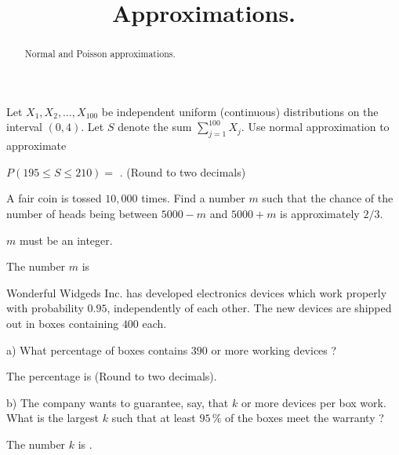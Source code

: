 \documentclass{ximera}
\title{Approximations.}
\begin{document}
\begin{abstract}
Normal and Poisson approximations.
\end{abstract}
\maketitle

Let $X_{1}, X_{2}, \dots, X_{100}$ be independent uniform (continuous) distributions on the interval $(0,4)$. Let $S$ denote the sum $\sum_{j=1}^{100} X_{j}$. Use normal approximation to approximate

\begin{question} 
     \begin{solution}
          $P(195\leq S \leq 210) = $  . (Round to two decimals)
     \end{solution}
\end{question}

A fair coin is tossed $10,000$ times. Find a number $m$ such that the chance of the number of heads being between $5000-m$ and $5000+m$ is approximately $2/3$.

\begin{question}
    \begin{hint}
         $m$ must be an integer.
    \end{hint}
     \begin{solution}
          The number $m$ is 
     \end{solution}
\end{question}

Wonderful Widgeds Inc. has developed electronics devices which work properly with probability $0.95$, independently of each other. The new devices are shipped out in boxes containing $400$ each.

\begin{question}
     a) What percentage of boxes contains $390$ or more working devices ?
     \begin{solution}
           The percentage is  (Round to two decimals).
     \end{solution}
\end{question}

\begin{question}
     b) The company wants to guarantee, say, that $k$ or more devices per box work. What is the largest $k$ such that at least $95\,\%$ of the boxes meet the warranty ?
     \begin{solution}
           The number $k$ is .
     \end{solution}
\end{question}
\end{document}

